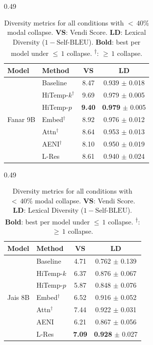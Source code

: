 \documentclass[11pt]{article}
\begin{document}
\begin{table}[t]
\vspace{0.8em}

\begin{subtable}[t]{0.49\textwidth}
\centering
\begin{tabular}{l l c c}
\toprule
\textbf{Model} & \textbf{Method} & VS & LD \\
\midrule
\multirow{7}{*}{Fanar 9B}
  & Baseline & 8.47 & 0.939 $\pm$ 0.018 \\
  & HiTemp-$k^\dagger$ & 9.69 & 0.979 $\pm$ 0.005 \\
  & HiTemp-$p$ & \textbf{9.40} & \textbf{0.979} $\pm$ 0.005 \\
  \cmidrule(l){2-4}
  & Embed$^\dagger$ & 8.92 & 0.976 $\pm$ 0.012 \\
  & Attn$^\dagger$ & 8.64 & 0.953 $\pm$ 0.013 \\
  & AENI$^\dagger$ & 8.10 & 0.950 $\pm$ 0.019 \\
  & L-Res & 8.61 & 0.940 $\pm$ 0.024 \\
\bottomrule
\end{tabular}
\caption{Fanar 9B}
\end{subtable}
\hspace{0.01\textwidth}
\begin{subtable}[t]{0.49\textwidth}
\centering
\begin{tabular}{l l c c}
\toprule
\textbf{Model} & \textbf{Method} & VS & LD \\
\midrule
\multirow{7}{*}{Jais 8B}
  & Baseline & 4.71 & 0.762 $\pm$ 0.139 \\
  & HiTemp-$k$ & 6.37 & 0.876 $\pm$ 0.067 \\
  & HiTemp-$p$ & 5.87 & 0.848 $\pm$ 0.076 \\
  \cmidrule(l){2-4}
  & Embed$^\dagger$ & 6.52 & 0.916 $\pm$ 0.052 \\
  & Attn$^\dagger$ & 7.44 & 0.922 $\pm$ 0.031 \\
  & AENI & 6.21 & 0.867 $\pm$ 0.056 \\
  & L-Res & \textbf{7.09} & \textbf{0.928} $\pm$ 0.027 \\
\bottomrule
\end{tabular}
\caption{Jais 8B}
\end{subtable}

\vspace{0.8em}

\vspace{0.5em}
\caption{%
Diversity metrics for all conditions with ${<}\,40\%$ modal collapse.
\textbf{VS}: Vendi Score.
\textbf{LD}: Lexical Diversity ($1 - \text{Self-BLEU}$).
\textbf{Bold}: best per model under ${\leq}\,1$ collapse.
\textsuperscript{$\dagger$}: ${\geq}\,1$ collapse.}
\label{tab:diversity_split}

\end{table}
\end{document}
